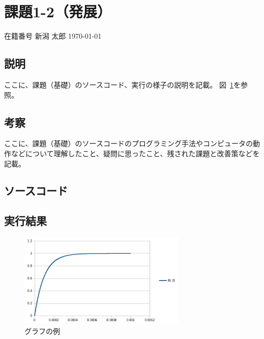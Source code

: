 \documentclass[a4paper,12pt,uplatex]{jsarticle}
\newcommand{\mynumber}{在籍番号} %
\newcommand{\myname}{新潟 太郎} %
\newcommand{\myheader}{ %
\begin{flushright}
\mynumber\hspace{1zw} \myname\hspace{1zw} \today\end{flushright}}
\begin{document}

\newpage

\section*{課題1-2（発展）}

\myheader



\subsection*{説明}



ここに、課題（基礎）のソースコード、実行の様子の説明を記載。
図~\ref{graph}を参照。



\subsection*{考察}



ここに、課題（基礎）のソースコードのプログラミング手法やコンピュータの動作などについて理解したこと、疑問に思ったこと、残された課題と改善策などを記載。



\subsection*{ソースコード}




% 



\subsection*{実行結果}

\begin{figure}[h]
\centering
\includegraphics[width=80mm]{graph.png}
\caption{グラフの例}\label{graph}
\end{figure}
\end{document}
